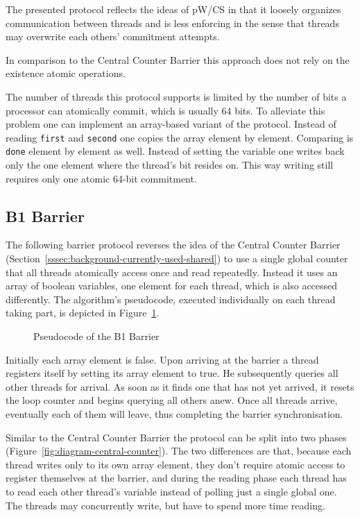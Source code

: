\documentclass[a4paper, 10pt]{article}
\begin{document}
The presented protocol reflects the ideas of pW/CS in that it loosely organizes communication between threads and is less enforcing in the sense that threads may overwrite each others' commitment attempts.

In comparison to the Central Counter Barrier this approach does not rely on the existence atomic operations.

The number of threads this protocol supports is limited by the number of bits a processor can atomically commit, which is usually 64 bits. To alleviate this problem one can implement an array-based variant of the protocol. Instead of reading \texttt{first} and \texttt{second} one copies the array element by element. Comparing is \texttt{done} element by element as well. Instead of setting the variable one writes back only the one element where the thread's bit resides on. This way writing still requires only one atomic 64-bit commitment.

\subsection{B1 Barrier}
\label{ssec:new-b1}

The following barrier protocol reverses the idea of the Central Counter Barrier (Section~\ref{sssec:background-currently-used-shared}) to use a single global counter that all threads atomically access once and read repeatedly. Instead it uses an array of boolean variables, one element for each thread, which is also accessed differently.
The algorithm's pseudocode, executed individually on each thread taking part, is depicted in Figure~\ref{fig:pseudocode-b1}.

\begin{figure}[htbp]
	\centering
	
	\caption{Pseudocode of the B1 Barrier}
	\label{fig:pseudocode-b1}
\end{figure}

Initially each array element is false. Upon arriving at the barrier a thread registers itself by setting its array element to true. He subsequently queries all other threads for arrival. As soon as it finds one that has not yet arrived, it resets the loop counter and begins querying all others anew. Once all threads arrive, eventually each of them will leave, thus completing the barrier synchronisation.

Similar to the Central Counter Barrier the protocol can be split into two phases (Figure~\ref{fig:diagram-central-counter}).
The two differences are that, because each thread writes only to its own array element, they don't require atomic access to register themselves at the barrier, and during the reading phase each thread has to read each other thread's variable instead of polling just a single global one. The threads may concurrently write, but have to spend more time reading.
\end{document}
